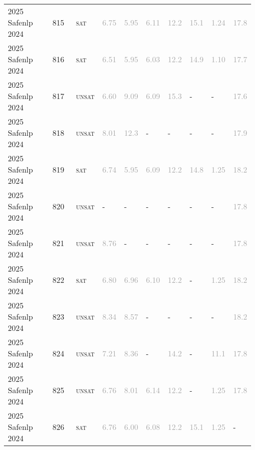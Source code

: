 \begin{center}
{\begin{longtable}{@{}llllllllll@{}}
2025 Safenlp 2024 & 815 & ~\textsc{sat} & \textcolor{darkgray}{6.75} & \textcolor{darkgray}{5.95} & \textcolor{darkgray}{6.11} & \textcolor{darkgray}{12.2} & \textcolor{darkgray}{15.1} & \textcolor{darkgray}{1.24} & \textcolor{darkgray}{17.8} \\
2025 Safenlp 2024 & 816 & ~\textsc{sat} & \textcolor{darkgray}{6.51} & \textcolor{darkgray}{5.95} & \textcolor{darkgray}{6.03} & \textcolor{darkgray}{12.2} & \textcolor{darkgray}{14.9} & \textcolor{darkgray}{1.10} & \textcolor{darkgray}{17.7} \\
2025 Safenlp 2024 & 817 & ~\textsc{unsat} & \textcolor{darkgray}{6.60} & \textcolor{darkgray}{9.09} & \textcolor{darkgray}{6.09} & \textcolor{darkgray}{15.3} & - & - & \textcolor{darkgray}{17.6} \\
2025 Safenlp 2024 & 818 & ~\textsc{unsat} & \textcolor{darkgray}{8.01} & \textcolor{darkgray}{12.3} & - & - & - & - & \textcolor{darkgray}{17.9} \\
2025 Safenlp 2024 & 819 & ~\textsc{sat} & \textcolor{darkgray}{6.74} & \textcolor{darkgray}{5.95} & \textcolor{darkgray}{6.09} & \textcolor{darkgray}{12.2} & \textcolor{darkgray}{14.8} & \textcolor{darkgray}{1.25} & \textcolor{darkgray}{18.2} \\
2025 Safenlp 2024 & 820 & ~\textsc{unsat} & - & - & - & - & - & - & \textcolor{darkgray}{17.8} \\
2025 Safenlp 2024 & 821 & ~\textsc{unsat} & \textcolor{darkgray}{8.76} & - & - & - & - & - & \textcolor{darkgray}{17.8} \\
2025 Safenlp 2024 & 822 & ~\textsc{sat} & \textcolor{darkgray}{6.80} & \textcolor{darkgray}{6.96} & \textcolor{darkgray}{6.10} & \textcolor{darkgray}{12.2} & - & \textcolor{darkgray}{1.25} & \textcolor{darkgray}{18.2} \\
2025 Safenlp 2024 & 823 & ~\textsc{unsat} & \textcolor{darkgray}{8.34} & \textcolor{darkgray}{8.57} & - & - & - & - & \textcolor{darkgray}{18.2} \\
2025 Safenlp 2024 & 824 & ~\textsc{unsat} & \textcolor{darkgray}{7.21} & \textcolor{darkgray}{8.36} & - & \textcolor{darkgray}{14.2} & - & \textcolor{darkgray}{11.1} & \textcolor{darkgray}{17.8} \\
2025 Safenlp 2024 & 825 & ~\textsc{unsat} & \textcolor{darkgray}{6.76} & \textcolor{darkgray}{8.01} & \textcolor{darkgray}{6.14} & \textcolor{darkgray}{12.2} & - & \textcolor{darkgray}{1.25} & \textcolor{darkgray}{17.8} \\
2025 Safenlp 2024 & 826 & ~\textsc{sat} & \textcolor{darkgray}{6.76} & \textcolor{darkgray}{6.00} & \textcolor{darkgray}{6.08} & \textcolor{darkgray}{12.2} & \textcolor{darkgray}{15.1} & \textcolor{darkgray}{1.25} & - \\

\end{longtable}}
\end{center}
